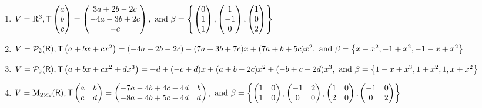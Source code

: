 \begin{exercise}
\begin{enumerate}
\item
\(
    V=\mathrm{R}^{3}, \textsf{T}\begin{pmatrix}a \\ b \\ c\end{pmatrix}=\begin{pmatrix}3 a+2 b-2 c \\ -4 a-3 b+2 c \\ -c\end{pmatrix},
    \text{ and } \\
    \beta=\left\{
        \begin{pmatrix} 0 \\ 1 \\ 1 \end{pmatrix},
        \begin{pmatrix} 1 \\ -1 \\ 0 \end{pmatrix},
        \begin{pmatrix} 1 \\ 0 \\ 2 \end{pmatrix}
    \right\}
\)

\item
\(
    V=\mathcal{P}_{2}(\textsf{R}), \textsf{T}\left(a+b x+c x^{2}\right)=  (-4 a+2 b-2 c)-(7 a+3 b+7 c) x+(7 a+b+5 c) x^{2},
    \text{ and } \\
    \beta=\left\{ x-x^{2},-1+x^{2},-1-x+x^{2}\right\}
\)

\item
\(
    V=\mathcal{P}_{3}(\textsf{R}), \\
    \textsf{T}\left(a+b x+c x^{2}+d x^{3}\right) = -d+(-c+d) x+(a+b-2 c) x^{2}+(-b+c-2 d) x^{3}, \\
    \text{ and }
    \beta=\left\{1-x+x^{3}, 1+x^{2}, 1, x+x^{2}\right\}
\)

\item
\(
    V=\mathrm{M}_{2 \times 2}(\textsf{R}), \textsf{T}\begin{pmatrix}a & b \\ c & d\end{pmatrix}=\begin{pmatrix}-7 a-4 b+4 c-4 d & b \\ -8 a-4 b+5 c-4 d & d\end{pmatrix}, \\
    \text{ and }
    \beta=\left\{
        \begin{pmatrix} 1 & 0 \\ 1 & 0 \end{pmatrix},
        \begin{pmatrix} -1 & 2 \\ 0 & 0 \end{pmatrix},
        \begin{pmatrix} 1 & 0 \\ 2 & 0 \end{pmatrix},
        \begin{pmatrix} -1 & 0 \\ 0 & 2 \end{pmatrix}
    \right\}
\)
\end{enumerate}
\end{exercise}

